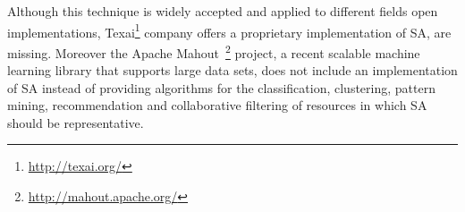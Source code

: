 Although this technique is widely accepted and applied to different fields open implementations, 
Texai\footnote{\url{http://texai.org/}} company offers a proprietary implementation of SA, are missing. Moreover 
the Apache Mahout~\footnote{\url{http://mahout.apache.org/}} project, a recent scalable machine learning library 
that supports large data sets, does not include an implementation of SA instead of 
providing algorithms for the classification, clustering, pattern mining, 
recommendation and collaborative filtering of resources in which SA should be representative. 
 


